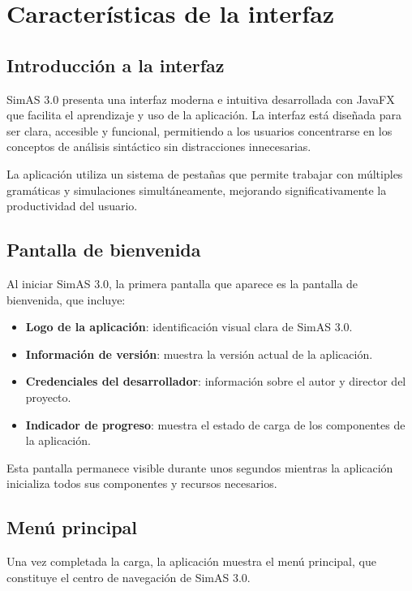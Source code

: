 \chapter{Características de la interfaz}

\section{Introducción a la interfaz}

SimAS 3.0 presenta una interfaz moderna e intuitiva desarrollada con JavaFX \cite{javafx} que facilita el aprendizaje y uso de la aplicación. La interfaz está diseñada para ser clara, accesible y funcional, permitiendo a los usuarios concentrarse en los conceptos de análisis sintáctico sin distracciones innecesarias.

La aplicación utiliza un sistema de pestañas que permite trabajar con múltiples gramáticas y simulaciones simultáneamente, mejorando significativamente la productividad del usuario.

\section{Pantalla de bienvenida}

Al iniciar SimAS 3.0, la primera pantalla que aparece es la pantalla de bienvenida, que incluye:

\begin{itemize}
    \item \textbf{Logo de la aplicación}: identificación visual clara de SimAS 3.0.
    \item \textbf{Información de versión}: muestra la versión actual de la aplicación.
    \item \textbf{Credenciales del desarrollador}: información sobre el autor y director del proyecto.
    \item \textbf{Indicador de progreso}: muestra el estado de carga de los componentes de la aplicación.
\end{itemize}

Esta pantalla permanece visible durante unos segundos mientras la aplicación inicializa todos sus componentes y recursos necesarios.

\section{Menú principal}

Una vez completada la carga, la aplicación muestra el menú principal, que constituye el centro de navegación de SimAS 3.0.

